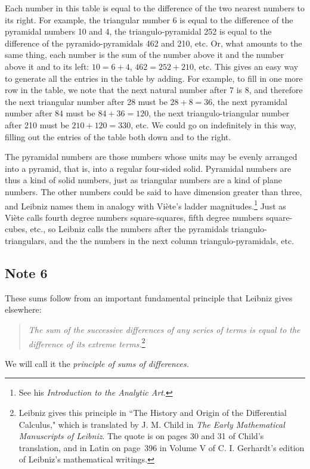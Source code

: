 \documentclass[twoside,openright]{article}
\begin{document}
Each number in this table is equal to the difference of the two nearest numbers to its right.  For example, the triangular number 6 is equal to the difference of the pyramidal numbers 10 and 4, the triangulo-pyramidal 252 is equal to the difference of the pyramido-pyramidals 462 and 210, etc.  Or, what amounts to the same thing, each number is the sum of the number above it and the number above it and to its left: $10= 6+4$, $462 = 252 + 210$, etc. This gives an easy way to generate all the entries in the table by adding.  For example, to fill in one more row in the table, we note that the next natural number after 7 is 8, and therefore the next triangular number after 28 must be $28+8 = 36$, the next pyramidal number after 84 must be $84 + 36 = 120$, the next triangulo-triangular number after 210  must be $210 + 120 = 330$, etc.  We could go on indefinitely in this way, filling out the entries of the table both down and to the right.

The pyramidal numbers are those numbers whose units may be evenly arranged into a pyramid, that is, into a regular four-sided solid.  Pyramidal numbers are thus a kind of solid numbers, just as triangular numbers are a kind of plane numbers.  The other numbers could be said to have dimension greater than three, and Leibniz names them in analogy with Vi\`{e}te's ladder magnitudes.\footnote{See his {\em Introduction to the Analytic Art}.}   Just as Vi\`{e}te calls fourth degree numbers square-squares, fifth degree numbers square-cubes, etc., so Leibniz calls the numbers after the pyramidals triangulo-triangulars, and the the numbers in the next column triangulo-pyramidals, etc.

\subsection*{Note 6}
\label{caa6}

\label{begsersum}These sums follow from an important fundamental principle that Leibniz gives elsewhere:
\begin{quote}\label{princsd}
{\em The sum of the successive differences of any series of terms is equal to the difference of its extreme terms.}\footnote{Leibniz gives this principle in ``The History and Origin of the Differential Calculus," which is translated by J. M. Child in {\em The Early Mathematical Manuscripts of Leibniz}.  The quote is on pages 30 and 31 of Child's translation, and in Latin on page~396 in Volume V of C. I. Gerhardt's edition of Leibniz's mathematical writings.}
\end{quote}
We will call it the {\em principle of sums of differences.}
\end{document}
